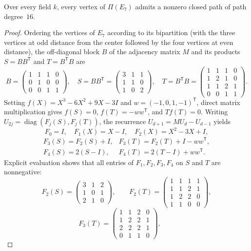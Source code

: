 \begin{lemma}
\label{lem:e7-sixteen-return}
Over every field $k$, every vertex of $\Pi(E_7)$ admits a nonzero closed path of path degree~$16$.
\end{lemma}
\begin{proof}
Ordering the vertices of $E_7$ according to its bipartition (with the three vertices at odd distance from the center followed by the four vertices at even distance), the off-diagonal block $B$ of the adjacency matrix $M$ and its products $S=BB^{\mathsf T}$ and $T=B^{\mathsf T}B$ are
\[
  B=\begin{pmatrix}1&1&1&0\\0&1&0&0\\0&0&1&1\end{pmatrix},\quad
  S=BB^{\mathsf T}=\begin{pmatrix}3&1&1\\1&1&0\\1&0&2\end{pmatrix},\quad
  T=B^{\mathsf T}B=\begin{pmatrix}1&1&1&0\\1&2&1&0\\1&1&2&1\\0&0&1&1\end{pmatrix}.
\]
Setting $f(X)=X^3-6X^2+9X-3I$ and $w=(-1,0,1,-1)^{\mathsf T}$, direct matrix multiplication gives $f(S)=0$, $f(T)=-ww^{\mathsf T}$, and $Tf(T)=0$. Writing $U_{2j}=\operatorname{diag}(F_j(S),F_j(T))$, the recurrence $U_{d+1}=MU_d-U_{d-1}$ yields
\[
  F_0=I,\quad F_1(X)=X-I,\quad F_2(X)=X^2-3X+I,
\]
\[
  \begin{array}{ll}
  F_3(S)=F_2(S)+I, & F_3(T)=F_2(T)+I-ww^{\mathsf T},\\
  F_4(S)=2(S-I), & F_4(T)=2(T-I)+ww^{\mathsf T}.
  \end{array}
\]
Explicit evaluation shows that all entries of $F_1,F_2,F_3,F_4$ on $S$ and $T$ are nonnegative:
\[
  F_2(S)=\begin{pmatrix}3&1&2\\1&0&1\\2&1&0\end{pmatrix},\qquad
  F_2(T)=\begin{pmatrix}1&1&1&1\\1&1&2&1\\1&2&2&0\\1&1&0&0\end{pmatrix},
\]
\[
  F_3(T)=\begin{pmatrix}1&1&2&0\\1&2&2&1\\2&2&2&1\\0&1&1&0\end{pmatrix},\qquad
\]
\end{proof}
